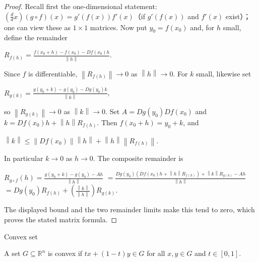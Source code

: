 \begin{proof}

Recall first the one-dimensional statement: \(\left( {\frac{d}{d}x} \right)\left( {g \circ f} \right)(x) = g'\left( {f(x)} \right)f'(x)\)（if \(g'\left( {f(x)} \right)\) and \(f'(x)\) exist）；one can view these as \(1 \times 1\) matrices. Now put \(y_{0} = f\left( x_{0} \right)\) and, for \(h\) small, define the remainder

\(R_{f{(h)}} = \frac{f\left( {x_{0} + h} \right) - f\left( x_{0} \right) - Df\left( x_{0} \right)h}{\left\| h \right\|}\).

Since \(f\) is differentiable, \(\left\| R_{f{(h)}} \right\|\rightarrow 0\) as \(\left\| h \right\|\rightarrow 0\). For \(k\) small, likewise set

\(R_{g{(k)}} = \frac{g\left( {y_{0} + k} \right) - g\left( y_{0} \right) - Dg\left( y_{0} \right)k}{\left\| k \right\|}\),

so \(\left\| R_{g{(k)}} \right\|\rightarrow 0\) as \(\left\| k \right\|\rightarrow 0\). Set \(A = Dg\left( y_{0} \right)Df\left( x_{0} \right)\) and \(k = Df\left( x_{0} \right)h + \left\| h \right\| R_{f{(h)}}\). Then \(f\left( {x_{0} + h} \right) = y_{0} + k\), and

\(\left\| k \right\| \leq \left\| {Df\left( x_{0} \right)} \right\|\left\| h \right\| + \left\| h \right\|\left\| R_{f{(h)}} \right\|\).

In particular \(k\rightarrow 0\) as \(h\rightarrow 0\). The composite remainder is

\(R_{g \circ f}(h) = \frac{g\left( {y_{0} + k} \right) - g\left( y_{0} \right) - Ah}{\left\| h \right\|}\) \(= \frac{Dg\left( y_{0} \right)\left( {Df\left( x_{0} \right)h + \left\| h \right\| R_{f{(h)}}} \right) + \left\| k \right\| R_{g{(k)}} - Ah}{\left\| h \right\|}\) \(= Dg\left( y_{0} \right)R_{f{(h)}} + \left( \frac{\left\| k \right\|}{\left\| h \right\|} \right)R_{g{(k)}}\).

The displayed bound and the two remainder limits make this tend to zero, which proves the stated matrix formula.

\end{proof}

\begin{definition}{Convex set}

A set \(G \subseteq \mathbb{R}^{n}\) is convex if \(tx + \left( {1 - t} \right)y \in G\) for all \(x,y \in G\) and \(t \in \left\lbrack {0,1} \right\rbrack\).

\end{definition}

